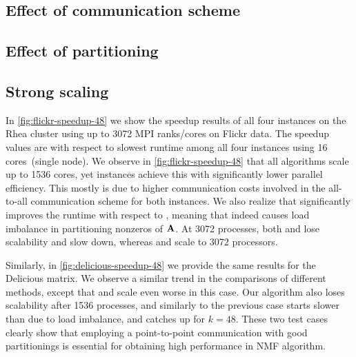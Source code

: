 
\subsection {Effect of communication scheme}

\subsection {Effect of partitioning}

\subsection {Strong scaling}

In \cref{fig:flickr-speedup-48} we show the speedup results of all four instances on the Rhea cluster using up 
to 3072 MPI ranks/cores on Flickr data.
The speedup values are with respect to slowest runtime among all four instances using 16 cores~(single node).
We observe in \cref{fig:flickr-speedup-48} that all algorithms scale up to 1536 cores, yet \mpifaun instances 
achieve this with significantly lower parallel efficiency.
This mostly is due to higher communication costs involved in the all-to-all communication scheme for both instances.
We also realize that \urp significantly improves the runtime with respect to \unp, meaning that \unp indeed causes load imbalance in partitioning nonzeros of $\mathbf{A}$.
At 3072 processes, both \urp and \unp lose scalability and slow down, whereas \cpp and \crp scale to 3072 processors.

Similarly, in \cref{fig:delicious-speedup-48} we provide the same results for the Delicious matrix.
We observe a similar trend in the comparisons of different methods, except that \urp and \unp scale even worse in this case.
Our algorithm also loses scalability after 1536 processes, and similarly to the previous case \cpp starts slower than \crp due to load imbalance, and catches up for $k = 48$.
These two test cases clearly show that employing a point-to-point communication with good partitionings is essential for obtaining high performance in NMF algorithm.


